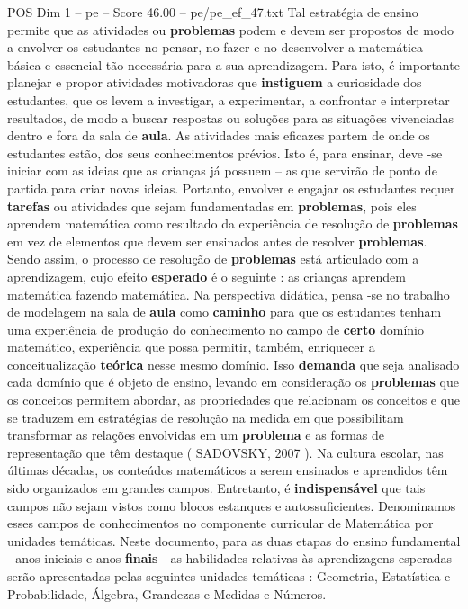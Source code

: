 \begin{textsample}{POS Dim 1 – pe – Score 46.00 – pe/pe\_ef\_47.txt}
Tal estratégia de ensino permite que as atividades ou \textbf{problemas} podem e devem ser propostos de modo a envolver os estudantes no pensar, no fazer e no desenvolver a matemática básica e essencial tão necessária para a sua aprendizagem.
Para isto, é importante planejar e propor atividades motivadoras que \textbf{instiguem} a curiosidade dos estudantes, que os levem a investigar, a experimentar, a confrontar e interpretar resultados, de modo a buscar respostas ou soluções para as situações vivenciadas dentro e fora da sala de \textbf{aula}.
As atividades mais eficazes partem de onde os estudantes estão, dos seus conhecimentos prévios.
Isto é, para ensinar, deve -se iniciar com as ideias que as crianças já possuem – as que servirão de ponto de partida para criar novas ideias.
Portanto, envolver e engajar os estudantes requer \textbf{tarefas} ou atividades que sejam fundamentadas em \textbf{problemas}, pois eles aprendem matemática como resultado da experiência de resolução de \textbf{problemas} em vez de elementos que devem ser ensinados antes de resolver \textbf{problemas}.
Sendo assim, o processo de resolução de \textbf{problemas} está articulado com a aprendizagem, cujo efeito \textbf{esperado} é o seguinte : as crianças aprendem matemática fazendo matemática.
Na perspectiva didática, pensa -se no trabalho de modelagem na sala de \textbf{aula} como \textbf{caminho} para que os estudantes tenham uma experiência de produção do conhecimento no campo de \textbf{certo} domínio matemático, experiência que possa permitir, também, enriquecer a conceitualização \textbf{teórica} nesse mesmo domínio.
Isso \textbf{demanda} que seja analisado cada domínio que é objeto de ensino, levando em consideração os \textbf{problemas} que os conceitos permitem abordar, as propriedades que relacionam os conceitos e que se traduzem em estratégias de resolução na medida em que possibilitam transformar as relações envolvidas em um \textbf{problema} e as formas de representação que têm destaque ( SADOVSKY, 2007 ).
Na cultura escolar, nas últimas décadas, os conteúdos matemáticos a serem ensinados e aprendidos têm sido organizados em grandes campos.
Entretanto, é \textbf{indispensável} que tais campos não sejam vistos como blocos estanques e autossuficientes.
Denominamos esses campos de conhecimentos no componente curricular de Matemática por unidades temáticas.
Neste documento, para as duas etapas do ensino fundamental - anos iniciais e anos \textbf{finais} - as habilidades relativas às aprendizagens esperadas serão apresentadas pelas seguintes unidades temáticas : Geometria, Estatística e Probabilidade, Álgebra, Grandezas e Medidas e Números.

\end{textsample}
